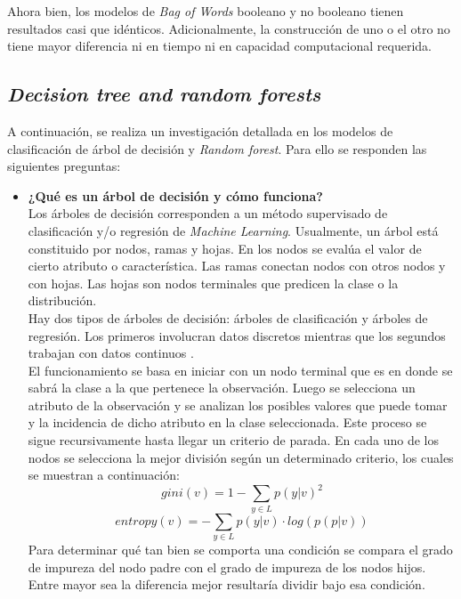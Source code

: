 Ahora bien, los modelos de \textit{Bag of Words} booleano y no booleano tienen resultados casi que idénticos. Adicionalmente, la construcción de uno o el otro no tiene mayor diferencia ni en tiempo ni en capacidad computacional requerida. 

\subsection{\textit{Decision tree and random forests}}

A continuación, se realiza un investigación detallada en los modelos de clasificación de árbol de decisión y \textit{Random forest}. Para ello se responden las siguientes preguntas:
\begin{itemize}
    \item \textbf{¿Qué es un árbol de decisión y cómo funciona?}\\
    
    Los árboles de decisión corresponden a un método supervisado de clasificación y/o regresión de \textit{Machine Learning}. Usualmente, un árbol está constituido por nodos, ramas y hojas. En los nodos se evalúa el valor de cierto atributo o característica. Las ramas conectan nodos con otros nodos y con hojas. Las hojas son nodos terminales que predicen la clase o la distribución.\\
    Hay dos tipos de árboles de decisión: árboles de clasificación y árboles de regresión. Los primeros involucran datos discretos mientras que los segundos trabajan con datos continuos \cite{Sklearn-DT}. \\
    El funcionamiento se basa en iniciar con un nodo terminal que es en donde se sabrá la clase a la que pertenece la observación. Luego se selecciona un atributo de la observación y se analizan los posibles valores que puede tomar y la incidencia de dicho atributo en la clase seleccionada. Este proceso se sigue recursivamente hasta llegar un criterio de parada. En cada uno de los nodos se selecciona la mejor división según un determinado criterio, los cuales se muestran a continuación:
    \begin{equation}
        gini(v) = 1-\sum_{y \in L} p(y|v)^2
    \end{equation}
    \begin{equation}
        entropy(v) = -\sum_{y \in L} p(y|v) \cdot log(p(p|v))
    \end{equation}
    Para determinar qué tan bien se comporta una condición se compara el grado de impureza del nodo padre con el grado de impureza de los nodos hijos. Entre mayor sea la diferencia mejor resultaría dividir bajo esa condición.  
    

\end{itemize}
